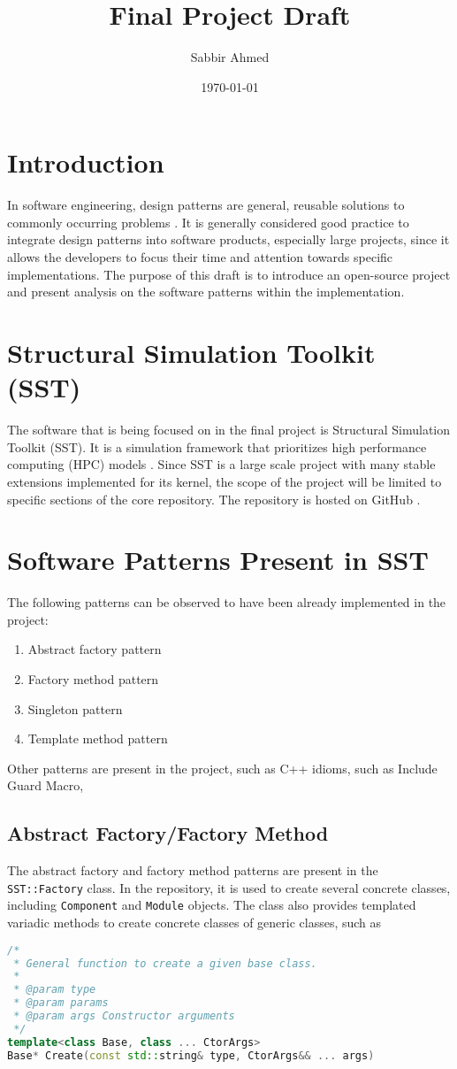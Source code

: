 \documentclass[titlepage]{article}
\title{Final Project Draft}
\author{Sabbir Ahmed}
\date{\today}
\begin{document}
\maketitle

\section{Introduction}
In software engineering, design patterns are general, reusable solutions to commonly occurring problems \cite{source-making}. It is generally considered good practice to integrate design patterns into software products, especially large projects, since it allows the developers to focus their time and attention towards specific implementations. The purpose of this draft is to introduce an open-source project and present analysis on the software patterns within the implementation.

\section{Structural Simulation Toolkit (SST)}
The software that is being focused on in the final project is Structural Simulation Toolkit (SST). It is a simulation framework that prioritizes high performance computing (HPC) models \cite{sst}. Since SST is a large scale project with many stable extensions implemented for its kernel, the scope of the project will be limited to specific sections of the core repository. The repository is hosted on GitHub \cite{sst-repo}.

\section{Software Patterns Present in SST}
The following patterns can be observed to have been already implemented in the project:
\begin{enumerate}
    \item Abstract factory pattern
    \item Factory method pattern
    \item Singleton pattern
    \item Template method pattern
\end{enumerate}

Other patterns are present in the project, such as C++ idioms, such as Include Guard Macro,

\subsection{Abstract Factory/Factory Method}
The abstract factory and factory method patterns are present in the \texttt{SST::Factory} class. In the repository, it is used to create several concrete classes, including \texttt{Component} and \texttt{Module} objects. The class also provides templated variadic methods to create concrete classes of generic classes, such as
\begin{lstlisting}[language=c++]
/*
 * General function to create a given base class.
 *
 * @param type
 * @param params
 * @param args Constructor arguments
 */
template<class Base, class ... CtorArgs>
Base* Create(const std::string& type, CtorArgs&& ... args)
\end{lstlisting}
\end{document}
